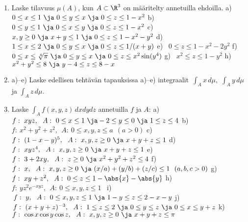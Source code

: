 \Harj
\begin{enumerate}

\item
Laske tilavuus $\mu(A)$, kun $A\subset\R^3$ on määritelty annetuilla ehdoilla. 
\vspace{1mm}\newline
a) \ $0 \le x \le 1\ \ja\ 0 \le y \le x\ \ja\ 0 \le z \le 1-x^2$ \newline
b) \ $0 \le y \le 1\ \ja\ 0 \le x \le y\ \ja\ 0 \le z \le 1-x^2$ \newline
c) \ $x,y \ge 0\ \ja\ x+y \le 1\ \ja\ 0 \le z \le 1-x^2-y^2$ \newline
d) \ $1 \le x \le 2\ \ja\ 0 \le y \le x\ \ja\ 0 \le z \le 1/(x+y)$ \newline
e) \ $0 \le z \le 1-x^2-2y^2$ \newline
f) \ $0 \le x \le \sqrt[4]{\pi}\ \ja\ 0 \le y \le x\ \ja\ 0 \le z \le x^2\sin(y^4)$ \newline
g) \ $x^2 \le z \le 1-y^2$ \newline
h) \ $x^2+y^2 \le 8\ \ja\ y-4 \le z \le 8-x$

\item
a)--e) Laske edellisen tehtävän tapauksissa a)--e) integraalit $\,\int_A x\,d\mu$,
$\,\int_A y\,d\mu$ ja $\int_A z\,d\mu$.

\item
Laske $\int_A f(x,y,z)\,dxdydz$ annetuilla $f$ ja $A$: \vspace{1mm}\newline
a) \ $f:\ xyz,\ \ A:\ 0 \le x \le 1\ \ja -2 \le y \le 0\ \ja\ 1 \le z \le 4$ \newline
b) \ $f:\ x^2+y^2+z^2,\ \ A:\ 0 \le x,y,z \le a\ \ (a>0)$ \newline
c) \ $f:\ (1-x-y)^5,\ \ A:\ x,y,z \ge 0\ \ja\ x+y+z \le 1$ \newline
d) \ $f:\ xyz^4,\ \ A:\ x,y,z \ge 0\ \ja\ x+y+z \le 1$ \newline
e) \ $f:\ 3+2xy,\ \ A:\ z \ge 0\ \ja\ x^2+y^2+z^2 \le 4$ \newline
f) \ $f:\ x,\ \ A:\ x,y,z \ge 0\ \ja\ (x/a)+(y/b)+(z/c) \le 1\ \ (a,b,c>0)$ \newline
g) \ $f:\ xy+z^2,\ \ A:\ 0 \le z \le 1-\abs{x}-\abs{y}$ \newline
h) \ $f:\ yz^2e^{-xyz},\ \ A:\ 0 \le x,y,z \le 1$ \newline
i) \ $\,f:\ y,\ \ A:\ 0 \le x,y,z \le 1\ \ja\ 1-y \le z \le 2-x-y$ \newline
j) \ $\,f:\ (x+y+z)^{-3},\ \ A:\ 1 \le z \le 2\ \ja\ 0 \le y \le z\ 
                                                \ja\ 0 \le x \le y+z$ \newline
k) \ $f:\ \cos x\cos y\cos z,\ \ A:\ x,y,z \ge 0\ \ja\ x+y+z \le \pi$


\end{enumerate}
